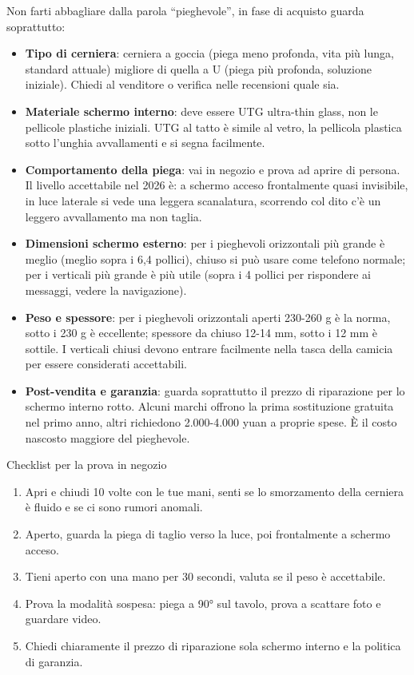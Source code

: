 Non farti abbagliare dalla parola “pieghevole”, in fase di acquisto guarda soprattutto:

\begin{itemize}
  \item \textbf{Tipo di cerniera}: cerniera a goccia (piega meno profonda, vita più lunga, standard attuale) migliore di quella a U (piega più profonda, soluzione iniziale). Chiedi al venditore o verifica nelle recensioni quale sia.
  \item \textbf{Materiale schermo interno}: deve essere UTG ultra-thin glass, non le pellicole plastiche iniziali. UTG al tatto è simile al vetro, la pellicola plastica sotto l'unghia avvallamenti e si segna facilmente.
  \item \textbf{Comportamento della piega}: vai in negozio e prova ad aprire di persona. Il livello accettabile nel 2026 è: a schermo acceso frontalmente quasi invisibile, in luce laterale si vede una leggera scanalatura, scorrendo col dito c'è un leggero avvallamento ma non taglia.
  \item \textbf{Dimensioni schermo esterno}: per i pieghevoli orizzontali più grande è meglio (meglio sopra i 6,4 pollici), chiuso si può usare come telefono normale; per i verticali più grande è più utile (sopra i 4 pollici per rispondere ai messaggi, vedere la navigazione).
  \item \textbf{Peso e spessore}: per i pieghevoli orizzontali aperti 230-260 g è la norma, sotto i 230 g è eccellente; spessore da chiuso 12-14 mm, sotto i 12 mm è sottile. I verticali chiusi devono entrare facilmente nella tasca della camicia per essere considerati accettabili.
  \item \textbf{Post-vendita e garanzia}: guarda soprattutto il prezzo di riparazione per lo schermo interno rotto. Alcuni marchi offrono la prima sostituzione gratuita nel primo anno, altri richiedono 2.000-4.000 yuan a proprie spese. È il costo nascosto maggiore del pieghevole.
\end{itemize}

\begin{tcbpractice}{Checklist per la prova in negozio}
\begin{enumerate}
  \item Apri e chiudi 10 volte con le tue mani, senti se lo smorzamento della cerniera è fluido e se ci sono rumori anomali.
  \item Aperto, guarda la piega di taglio verso la luce, poi frontalmente a schermo acceso.
  \item Tieni aperto con una mano per 30 secondi, valuta se il peso è accettabile.
  \item Prova la modalità sospesa: piega a 90° sul tavolo, prova a scattare foto e guardare video.
  \item Chiedi chiaramente il prezzo di riparazione sola schermo interno e la politica di garanzia.
\end{enumerate}

\end{tcbpractice}

